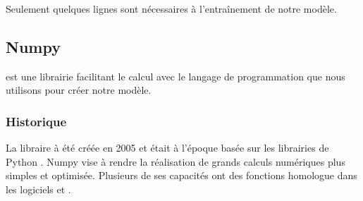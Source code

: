 \documentclass[letterpaper,10pt,french]{sphinxmanual}
\begin{document}
\begin{sphinxVerbatim}[commandchars=\\\{\}]
  \PYG{p}{[}
     
     
\PYG{p}{]}

              \PYG{p}{[}\PYG{p}{]}
  
\end{sphinxVerbatim}

Seulement quelques lignes sont nécessaires à l’entraînement de notre modèle.


\subsection{Numpy}
\label{\detokenize{explications_librairies:numpy}}
 est une librairie facilitant le calcul avec le langage de programmation que nous utilisons pour créer notre modèle.


\subsubsection{Historique}
\label{\detokenize{explications_librairies:id5}}
La libraire à été créée en 2005 et était à l’époque basée sur les librairies  de Python .
Numpy vise à rendre la réalisation de grands calculs numériques plus simples et optimisée. Plusieurs de ses capacités ont des fonctions homologue dans les logiciels  et .
\end{document}
